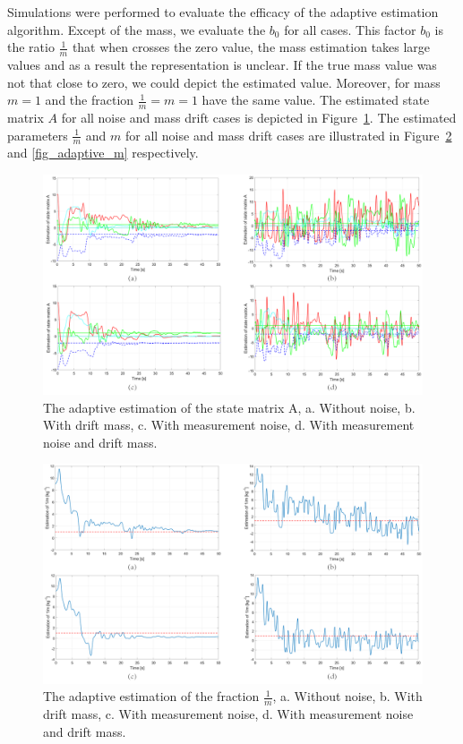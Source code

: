 \documentclass[12pt]{article}
\begin{document}
Simulations were performed to evaluate the efficacy of the adaptive estimation algorithm. Except of the mass, we evaluate the $b_0$ for all cases. This factor $b_0$ is the ratio $\frac{1}{m}$ that when crosses the zero value, the mass estimation takes large values and as a result the representation is unclear. If the true mass value was not that close to zero, we could depict the estimated value. Moreover, for mass $m=1$ and the fraction $\frac{1}{m}=m=1$ have the same value. The estimated state matrix $A$ for all noise and mass drift cases is depicted in Figure~\ref{fig_adaptive_A}. The estimated parameters $\frac{1}{m}$ and $m$ for all noise and mass drift cases are illustrated in Figure~\ref{fig_adaptive_1_m} and \ref{fig_adaptive_m} respectively. 
\begin{figure}[!h]
	\includegraphics[width=.95\columnwidth]{figures/adaptive_A.png}
	\centering
	\caption{The adaptive estimation of the state matrix A, a. Without noise, b. With drift mass, c. With measurement noise, d. With measurement noise and drift mass.}
	\label{fig_adaptive_A}
\end{figure}

\begin{figure}[!h]
	\includegraphics[width=1\columnwidth]{figures/adaptive_1_m.png}
	\centering
	\caption{The adaptive estimation of the fraction $\frac{1}{m}$, a. Without noise, b. With drift mass, c. With measurement noise, d. With measurement noise and drift mass.}
	\label{fig_adaptive_1_m}
\end{figure}
\end{document}
